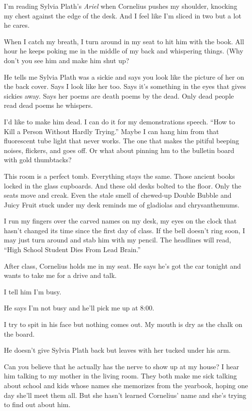 \documentclass[twoside,10pt]{book}
\begin{document}
I'm reading Sylvia Plath's \emph{Ariel} when Cornelius pushes my
shoulder, knocking my chest against the edge of the desk. And I feel
like I'm sliced in two but a lot he cares.

When I catch my breath, I turn around in my seat to hit him with the
book. All hour he keeps poking me in the middle of my back and
whispering things. (Why don't you see him and make him shut up?

He tells me Sylvia Plath was a sickie and says you look like the picture
of her on the back cover. Says I look like her too. Says it's something
in the eyes that gives sickies away. Says her poems are death poems by
the dead. Only dead people read dead poems he whispers.

I'd like to make him dead. I can do it for my demonstrations speech.
``How to Kill a Person Without Hardly Trying.'' Maybe I can hang him
from that fluorescent tube light that never works. The one that makes
the pitiful beeping noises, flickers, and goes off. Or what about
pinning hm to the bul­letin board with gold thumbtacks?

This room is a perfect tomb. Everything stays the same. Those ancient
books locked in the glass cupboards. And these old desks bolted to the
floor. Only the seats move and creak. Even the stale smell of chewed-up
Double Bubble and Juicy Fruit stuck under my desk reminds me of
gladiolas and chrysanthemums.

I run my fingers over the carved names on my desk, my eyes on the clock
that hasn't changed its time since the first day of class. If the bell
doesn't ring soon, I may just turn around and stab him with my pencil.
The headlines will read, ``High School Student Dies From Lead Brain.''

After class, Cornelius holds me in my seat. He says he's got the car
tonight and wants to take me for a drive and talk.

I tell him I'm busy.

He says I'm not busy and he'll pick me up at 8:00.

I try to spit in his face but nothing comes out. My mouth is dry as the
chalk on the board.

He doesn't give Sylvia Plath back but leaves with her tucked under his
arm.

Can you believe that he actually has the nerve to show up at my house? I
hear him talking to my mother in the living room. They both make me sick
talking about school and kids whose names she memorizes from the
yearbook, hoping one day she'll meet them all. But she hasn't learned
Cornelius' name and she's trying to find out about him.
\end{document}
